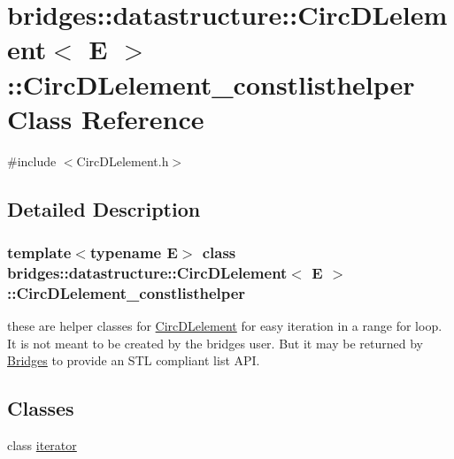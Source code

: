 \hypertarget{classbridges_1_1datastructure_1_1_circ_d_lelement_1_1_circ_d_lelement__constlisthelper}{}\section{bridges\+:\+:datastructure\+:\+:Circ\+D\+Lelement$<$ E $>$\+:\+:Circ\+D\+Lelement\+\_\+constlisthelper Class Reference}
\label{classbridges_1_1datastructure_1_1_circ_d_lelement_1_1_circ_d_lelement__constlisthelper}


{\ttfamily \#include $<$Circ\+D\+Lelement.\+h$>$}



\subsection{Detailed Description}
\subsubsection*{template$<$typename E$>$\newline
class bridges\+::datastructure\+::\+Circ\+D\+Lelement$<$ E $>$\+::\+Circ\+D\+Lelement\+\_\+constlisthelper}

these are helper classes for \hyperlink{classbridges_1_1datastructure_1_1_circ_d_lelement}{Circ\+D\+Lelement} for easy iteration in a range for loop. It is not meant to be created by the bridges user. But it may be returned by \hyperlink{classbridges_1_1_bridges}{Bridges} to provide an S\+TL compliant list A\+PI. \subsection*{Classes}
\begin{DoxyCompactItemize}
\item 
class \hyperlink{classbridges_1_1datastructure_1_1_circ_d_lelement_1_1_circ_d_lelement__constlisthelper_1_1iterator}{iterator}
\end{DoxyCompactItemize}
